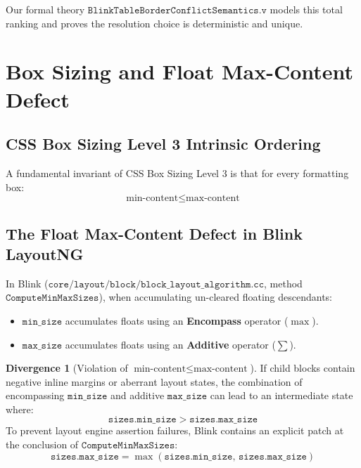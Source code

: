 \documentclass[11pt,a4paper]{article}
\theoremstyle{definition}
\newtheorem{divergence}{Divergence}[section]
\begin{document}
Our formal theory $\mathtt{BlinkTableBorderConflictSemantics.v}$ models this total ranking and proves the resolution choice is deterministic and unique.

\section{Box Sizing and Float Max-Content Defect}

\subsection{CSS Box Sizing Level 3 Intrinsic Ordering}
A fundamental invariant of CSS Box Sizing Level 3 is that for every formatting box:
\begin{equation}
    \text{min-content} \le \text{max-content}
\end{equation}

\subsection{The Float Max-Content Defect in Blink LayoutNG}
In Blink ($\mathtt{core/layout/block/block\_layout\_algorithm.cc}$, method $\mathtt{ComputeMinMaxSizes}$), when accumulating un-cleared floating descendants:
\begin{itemize}
    \item $\mathtt{min\_size}$ accumulates floats using an \textbf{Encompass} operator ($\max$).
    \item $\mathtt{max\_size}$ accumulates floats using an \textbf{Additive} operator ($\sum$).
\end{itemize}

\begin{divergence}[Violation of $\text{min-content} \le \text{max-content}$]
If child blocks contain negative inline margins or aberrant layout states, the combination of encompassing $\mathtt{min\_size}$ and additive $\mathtt{max\_size}$ can lead to an intermediate state where:
\begin{equation}
    \mathtt{sizes.min\_size} > \mathtt{sizes.max\_size}
\end{equation}
To prevent layout engine assertion failures, Blink contains an explicit patch at the conclusion of $\mathtt{ComputeMinMaxSizes}$:
\begin{equation}
    \mathtt{sizes.max\_size} = \max(\mathtt{sizes.min\_size},\, \mathtt{sizes.max\_size})
\end{equation}
\end{divergence}
\end{document}
